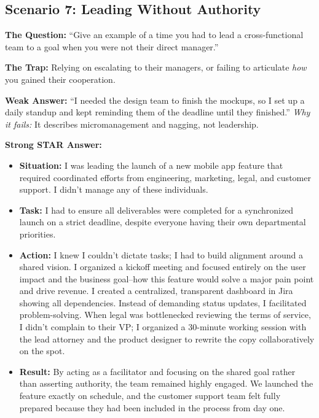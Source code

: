 \documentclass[
  11pt,
  openany,
  oneside]{book}
\providecommand{\tightlist}{%
  \setlength{\itemsep}{0pt}\setlength{\parskip}{0pt}}
\begin{document}
\subsection{Scenario 7: Leading Without
Authority}\label{scenario-7-leading-without-authority}

\textbf{The Question:} ``Give an example of a time you had to lead a
cross-functional team to a goal when you were not their direct
manager.''

\textbf{The Trap:} Relying on escalating to their managers, or failing
to articulate \emph{how} you gained their cooperation.

\textbf{Weak Answer:} ``I needed the design team to finish the mockups,
so I set up a daily standup and kept reminding them of the deadline
until they finished.'' \emph{Why it fails:} It describes micromanagement
and nagging, not leadership.

\textbf{Strong STAR Answer:}

\begin{itemize}
\tightlist
\item
  \textbf{Situation:} I was leading the launch of a new mobile app
  feature that required coordinated efforts from engineering, marketing,
  legal, and customer support. I didn't manage any of these individuals.
\item
  \textbf{Task:} I had to ensure all deliverables were completed for a
  synchronized launch on a strict deadline, despite everyone having
  their own departmental priorities.
\item
  \textbf{Action:} I knew I couldn't dictate tasks; I had to build
  alignment around a shared vision. I organized a kickoff meeting and
  focused entirely on the user impact and the business goal--how this
  feature would solve a major pain point and drive revenue. I created a
  centralized, transparent dashboard in Jira showing all dependencies.
  Instead of demanding status updates, I facilitated problem-solving.
  When legal was bottlenecked reviewing the terms of service, I didn't
  complain to their VP; I organized a 30-minute working session with the
  lead attorney and the product designer to rewrite the copy
  collaboratively on the spot.
\item
  \textbf{Result:} By acting as a facilitator and focusing on the shared
  goal rather than asserting authority, the team remained highly
  engaged. We launched the feature exactly on schedule, and the customer
  support team felt fully prepared because they had been included in the
  process from day one.
\end{itemize}
\end{document}
